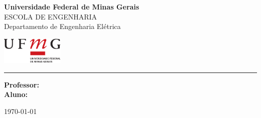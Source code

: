 \thispagestyle{empty}

\noindent
\begin{minipage}{0.8\linewidth}
  {\Large\bf Universidade Federal de Minas Gerais}\\
  {\small ESCOLA DE ENGENHARIA}\\
  {\sc Departamento de Engenharia Elétrica}
\end{minipage} 
\hfill 
\begin{minipage}{3cm}
  \includegraphics[width=3cm]{res/ufmg_ext.pdf}
\end{minipage}

\vspace{1mm}

\noindent
\hrule

\vspace{2.0cm}

\vfill

\begin{center}
  \Large \textsc{\textbf{\titleLa}}
\end{center}

\vfill

\begin{center}
  \Large\textsc{\textbf{\titleLb}}
\end{center}

\vfill

\begin{flushright}
    \begin{minipage}{12.0cm}
        {\bf Professor:} \nomeProfessor \\
        {\bf Aluno:} \nomeAluno     
    \end{minipage}
\end{flushright}

\vfill

\begin{center}
  \today
\end{center}

\vfill

\newpage